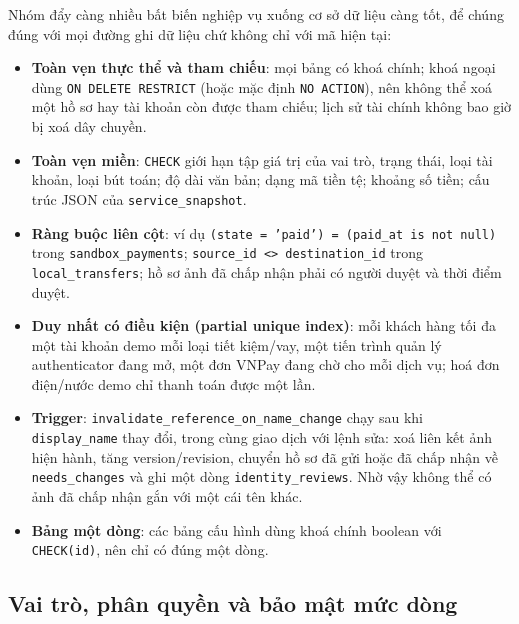 Nhóm đẩy càng nhiều bất biến nghiệp vụ xuống cơ sở dữ liệu càng tốt, để chúng đúng với mọi đường ghi dữ liệu chứ không chỉ với mã hiện tại:
\begin{itemize}
  \item \textbf{Toàn vẹn thực thể và tham chiếu}: mọi bảng có khoá chính; khoá ngoại dùng \texttt{ON DELETE RESTRICT} (hoặc mặc định \texttt{NO ACTION}), nên không thể xoá một hồ sơ hay tài khoản còn được tham chiếu; lịch sử tài chính không bao giờ bị xoá dây chuyền.
  \item \textbf{Toàn vẹn miền}: \texttt{CHECK} giới hạn tập giá trị của vai trò, trạng thái, loại tài khoản, loại bút toán; độ dài văn bản; dạng mã tiền tệ; khoảng số tiền; cấu trúc JSON của \texttt{service\_\allowbreak{}snapshot}.
  \item \textbf{Ràng buộc liên cột}: ví dụ \texttt{(state = 'paid') = (paid\_\allowbreak{}at is not null)} trong \texttt{sandbox\_\allowbreak{}payments}; \texttt{source\_\allowbreak{}id <> destination\_\allowbreak{}id} trong \texttt{local\_\allowbreak{}transfers}; hồ sơ ảnh đã chấp nhận phải có người duyệt và thời điểm duyệt.
  \item \textbf{Duy nhất có điều kiện (partial unique index)}: mỗi khách hàng tối đa một tài khoản demo mỗi loại tiết kiệm/vay, một tiến trình quản lý authenticator đang mở, một đơn VNPay đang chờ cho mỗi dịch vụ; hoá đơn điện/nước demo chỉ thanh toán được một lần.
  \item \textbf{Trigger}: \texttt{invalidate\_reference\_\allowbreak on\_name\_change} chạy sau khi \texttt{display\_\allowbreak{}name} thay đổi, trong cùng giao dịch với lệnh sửa: xoá liên kết ảnh hiện hành, tăng version/revision, chuyển hồ sơ đã gửi hoặc đã chấp nhận về \texttt{needs\_\allowbreak{}changes} và ghi một dòng \texttt{identity\_\allowbreak{}reviews}. Nhờ vậy không thể có ảnh đã chấp nhận gắn với một cái tên khác.
  \item \textbf{Bảng một dòng}: các bảng cấu hình dùng khoá chính boolean với \texttt{CHECK(id)}, nên chỉ có đúng một dòng.
\end{itemize}

\subsection{Vai trò, phân quyền và bảo mật mức dòng}
\label{sec:ch2-roles}


